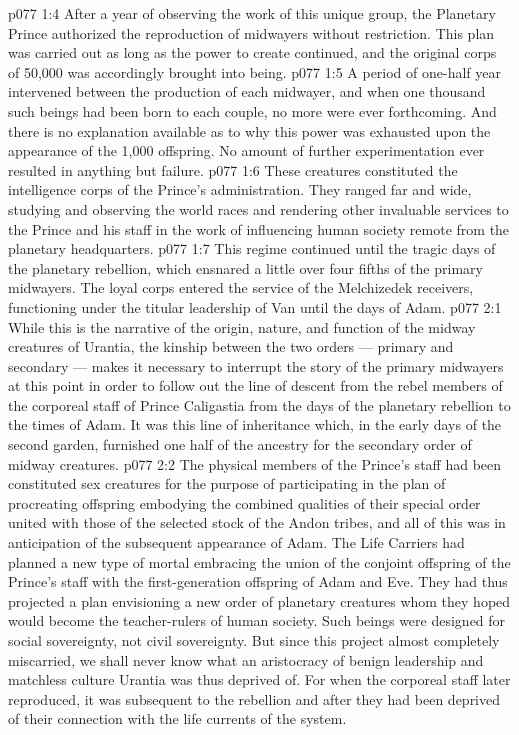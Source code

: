 \vs p077 1:4 After a year of observing the work of this unique group, the Planetary Prince authorized the reproduction of midwayers without restriction. This plan was carried out as long as the power to create continued, and the original corps of 50,000 was accordingly brought into being.
\vs p077 1:5 A period of one\hyp{}half year intervened between the production of each midwayer, and when one thousand such beings had been born to each couple, no more were ever forthcoming. And there is no explanation available as to why this power was exhausted upon the appearance of the 1,000 offspring. No amount of further experimentation ever resulted in anything but failure.
\vs p077 1:6 \pc These creatures constituted the intelligence corps of the Prince’s administration. They ranged far and wide, studying and observing the world races and rendering other invaluable services to the Prince and his staff in the work of influencing human society remote from the planetary headquarters.
\vs p077 1:7 This regime continued until the tragic days of the planetary rebellion, which ensnared a little over four fifths of the primary midwayers. The loyal corps entered the service of the Melchizedek receivers, functioning under the titular leadership of Van until the days of Adam.
\vs p077 2:1 While this is the narrative of the origin, nature, and function of the midway creatures of Urantia, the kinship between the two orders --- primary and secondary --- makes it necessary to interrupt the story of the primary midwayers at this point in order to follow out the line of descent from the rebel members of the corporeal staff of Prince Caligastia from the days of the planetary rebellion to the times of Adam. It was this line of inheritance which, in the early days of the second garden, furnished one half of the ancestry for the secondary order of midway creatures.
\vs p077 2:2 \pc The physical members of the Prince’s staff had been constituted sex creatures for the purpose of participating in the plan of procreating offspring embodying the combined qualities of their special order united with those of the selected stock of the Andon tribes, and all of this was in anticipation of the subsequent appearance of Adam. The Life Carriers had planned a new type of mortal embracing the union of the conjoint offspring of the Prince’s staff with the first\hyp{}generation offspring of Adam and Eve. They had thus projected a plan envisioning a new order of planetary creatures whom they hoped would become the teacher\hyp{}rulers of human society. Such beings were designed for social sovereignty, not civil sovereignty. But since this project almost completely miscarried, we shall never know what an aristocracy of benign leadership and matchless culture Urantia was thus deprived of. For when the corporeal staff later reproduced, it was subsequent to the rebellion and after they had been deprived of their connection with the life currents of the system.
